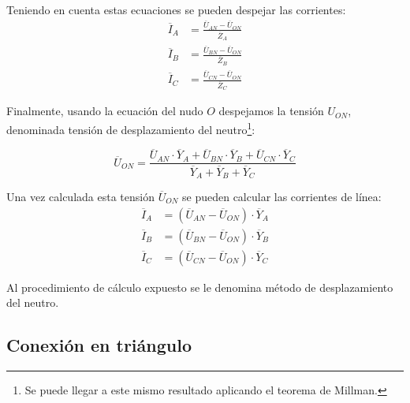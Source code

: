 Teniendo en cuenta estas ecuaciones se pueden despejar las corrientes:
\begin{align*}
  \overline{I}_A &= \frac{\overline{U}_{AN} - \overline{U}_{ON}}{\overline{Z}_A}\\
  \overline{I}_B &= \frac{\overline{U}_{BN} - \overline{U}_{ON}}{\overline{Z}_B}\\
  \overline{I}_C &= \frac{\overline{U}_{CN} - \overline{U}_{ON}}{\overline{Z}_C}
\end{align*}

Finalmente, usando la ecuación del nudo \(O\) despejamos la tensión \(U_{ON}\), denominada tensión de desplazamiento del neutro\footnote{Se puede llegar a este mismo resultado aplicando el teorema de Millman.}:

\begin{equation}
  \label{eq:desplazamiento-neutro}
  \overline{U}_{ON} = \frac{\overline{U}_{AN} \cdot \overline{Y}_A + \overline{U}_{BN} \cdot \overline{Y}_B + \overline{U}_{CN} \cdot \overline{Y}_C}{\overline{Y}_A + \overline{Y}_B + \overline{Y}_C}
\end{equation}

Una vez calculada esta tensión \(\overline{U}_{ON}\) se pueden calcular las corrientes de línea:
\begin{align*}
  \overline{I}_A &= (\overline{U}_{AN} - \overline{U}_{ON})\cdot{\overline{Y}_A}\\
  \overline{I}_B &= (\overline{U}_{BN} - \overline{U}_{ON})\cdot{\overline{Y}_B}\\
  \overline{I}_C &= (\overline{U}_{CN} - \overline{U}_{ON})\cdot{\overline{Y}_C}
\end{align*}

Al procedimiento de cálculo expuesto se le denomina método de desplazamiento del neutro.

\subsection{Conexión en triángulo}\label{sec.triangulo}
	
